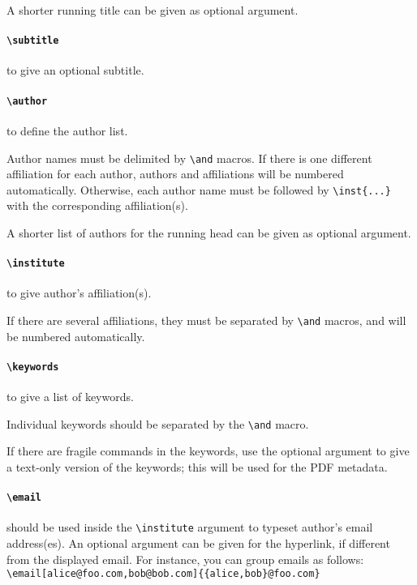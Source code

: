 \documentclass{iacrtrans}
\begin{document}
A shorter running title can be given as optional argument.

\paragraph{\texttt{\textbackslash subtitle}} to give an optional
subtitle.

\paragraph{\texttt{\textbackslash author}} to define the author list.

Author names must be delimited by \verb+\and+ macros.  If there is one
different affiliation for each author, authors and affiliations will be
numbered automatically.  Otherwise, each author name must be followed by
\verb+\inst{...}+ with the corresponding affiliation(s).

A shorter list of authors for the running head can be given as
optional argument.

\paragraph{\texttt{\textbackslash institute}} to give author's affiliation(s).

If there are several affiliations, they must be separated by
\verb+\and+ macros, and will be numbered automatically.

\paragraph{\texttt{\textbackslash keywords}} to give a list of
keywords.

Individual keywords should be separated by the \verb+\and+ macro.

If there are fragile commands in the keywords, use the optional argument
to give a text-only version of the keywords; this will be used for the
PDF metadata.

\paragraph{\texttt{\textbackslash email}} should be used inside the
\verb+\institute+ argument to typeset author's email address(es).  An
optional argument can be given for the hyperlink, if different from the
displayed email.  For instance, you can group emails as follows:\\
\verb+\email[alice@foo.com,bob@bob.com]{{alice,bob}@foo.com}+
\end{document}

